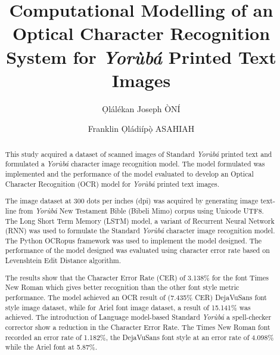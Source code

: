\documentclass[review]{elsarticle}
\newcommand{\yor}{\textit{Yor\`ub\'a }}
\newcommand{\oau}{\d{O}b\'{a}f\d{\'{e}}mi Aw\'{o}l\d{\'{o}}w\d{\`{o}} University}
\begin{document}
\begin{frontmatter}

\title{Computational Modelling of an Optical Character Recognition System for \yor Printed Text Images}



\author[rvt]{\d{O}l\'al\'ekan Joseph \`ON\'I}
\author[rvt]{Franklin \d{O}l\'adi\'ip\d{\`o} ASAHIAH}

\address[rvt]{Computing and Intelligent Systems Research Group, Department of Computer Science \& Engineering, \oau, Ile-Ife, Nigeria. 220282}




\begin{abstract}
	This study acquired a dataset of scanned images of Standard \yor printed text and formulated a \yor character image recognition model. The model formulated was implemented and the performance of the model evaluated to develop an Optical Character Recognition (OCR) model for \yor printed text images.
	
	The image dataset at 300 dots per inches (dpi) was acquired by generating image text-line from \yor New Testament Bible (Bibeli Mimo) corpus using Unicode UTF8. The Long Short Term Memory (LSTM) model, a variant of Recurrent Neural Network (RNN) was used to formulate the Standard \yor character image recognition model. The Python OCRopus framework was used to implement the model designed. The performance of the model designed was evaluated using character error rate based on Levenshtein Edit Distance algorithm. 
	
	The results show that the Character Error Rate (CER) of 3.138\% for the font Times New Roman which gives better recognition than the other font style metric performance. The model achieved an OCR result of (7.435\% CER) DejaVuSans font style image dataset, while for Ariel font image dataset, a result of 15.141\% was achieved. The introduction of Language model-based Standard \yor a spell-checker corrector show a reduction in the Character Error Rate. The Times New Roman font recorded an error rate of 1.182\%, the DejaVuSans font style at an error rate of 4.098\% while the Ariel font at 5.87\%.
	

\end{abstract}
\end{frontmatter}
\end{document}
